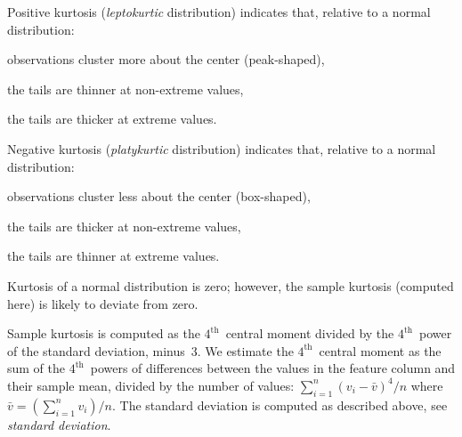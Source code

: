 \begin{Description}
Positive kurtosis (\emph{leptokurtic} distribution) indicates that, relative
to a normal distribution:
\begin{Itemize}
\item observations cluster more about the center (peak-shaped),
\item the tails are thinner at non-extreme values, 
\item the tails are thicker at extreme values.
\end{Itemize}
Negative kurtosis (\emph{platykurtic} distribution) indicates that, relative
to a normal distribution:
\begin{Itemize}
\item observations cluster less about the center (box-shaped),
\item the tails are thicker at non-extreme values, 
\item the tails are thinner at extreme values.
\end{Itemize}
Kurtosis of a normal distribution is zero; however, the sample kurtosis
(computed here) is likely to deviate from zero.

Sample kurtosis is computed as the $4^{\textrm{th}}$~central moment divided
by the $4^{\textrm{th}}$~power of the standard deviation, minus~3.
We estimate the $4^{\textrm{th}}$~central moment as the sum of the
$4^{\textrm{th}}$~powers of differences between the values in the feature column
and their sample mean, divided by the number of values:
$\sum_{i=1}^n (v_i - \bar{v})^4 / n$
where $\bar{v}=\left(\sum_{i=1}^n v_i\right)\!/n$.
The standard deviation is computed as described above, see \emph{standard deviation}.


\end{Description}
